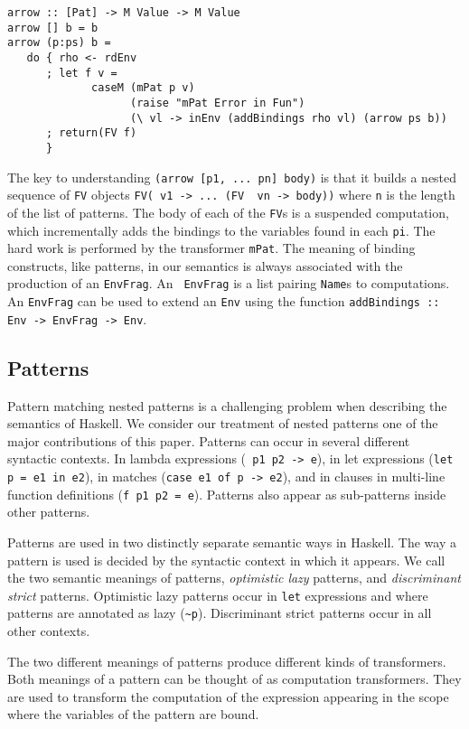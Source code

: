 \documentclass{entcs} \usepackage{entcsmacro}
\begin{document}
{\small
\begin{verbatim}
arrow :: [Pat] -> M Value -> M Value
arrow [] b = b
arrow (p:ps) b =
   do { rho <- rdEnv
      ; let f v = 
             caseM (mPat p v) 
                   (raise "mPat Error in Fun")
                   (\ vl -> inEnv (addBindings rho vl) (arrow ps b))
      ; return(FV f)
      }
\end{verbatim}
}

The key to understanding {\tt (arrow [p1, ... pn] body)} is that it builds a
nested sequence of {\tt FV} objects {\tt FV(\ v1 -> ... (FV \ vn -> body))}
where {\tt n} is the length of the list of patterns. The body of each of the
{\tt FV}s is a suspended computation, which incrementally adds the bindings to
the variables found in each {\tt pi}. The hard work is performed by the
transformer {\tt mPat}. The meaning of binding constructs, like patterns, in our
semantics is always associated with the production of an {\tt EnvFrag}. An {\tt
EnvFrag} is a list pairing {\tt Name}s to computations. An {\tt EnvFrag} can be
used to extend an {\tt Env} using the function {\tt addBindings :: Env ->
EnvFrag -> Env}.

\subsection{Patterns}\label{pattern}

Pattern matching nested patterns is a challenging problem when describing the
semantics of Haskell. We consider our treatment of nested patterns one of the
major contributions of this paper. Patterns can occur in several different
syntactic contexts. In lambda expressions ({\tt \ p1 p2 -> e}), in let
expressions ({\tt let p = e1 in e2}), in matches ({\tt case e1 of p -> e2}), and
in clauses in multi-line function definitions ({\tt f p1 p2 = e}). Patterns also
appear as sub-patterns inside other patterns.

Patterns are used in two distinctly separate semantic ways in Haskell. The way a
pattern is used is decided by the syntactic context in which it appears. We call
the two semantic meanings of patterns, {\em optimistic lazy} patterns, and {\em
discriminant strict} patterns. Optimistic lazy patterns occur in {\tt let}
expressions and where patterns are annotated as lazy (\verb+~p+). Discriminant
strict patterns occur in all other contexts. 

The two different meanings of patterns produce different kinds of transformers.
Both meanings of a pattern can be thought of as computation transformers. They
are used to transform the computation of the expression appearing in the
scope where the variables of the pattern are bound.
\end{document}
